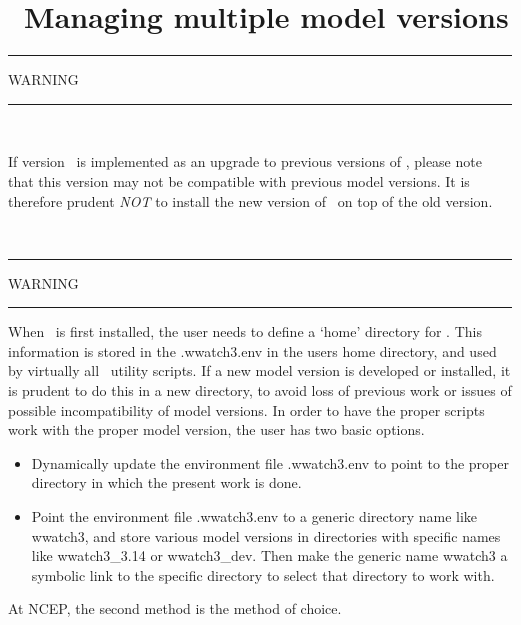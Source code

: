 \pagestyle{myheadings} \setcounter{page}{1} \setcounter{footnote}{0}

\section{~Managing multiple model versions} \label{app:more}
\newcounters 
\vssub

\begin{center}
\rule[1mm]{55mm}{1.0mm} WARNING \rule[1mm]{55mm}{1.0mm} \\ \vspace{\baselineskip}
\parbox{120mm}{If version \WWver\ is implemented as an upgrade to previous
versions of \ws, please note that this version may not be compatible with
previous model versions. It is therefore prudent {\it NOT} to install the new
version of \ws\ on top of the old version.} \\
\vspace{\baselineskip} \rule[1mm]{55mm}{1.0mm} WARNING
\rule[1mm]{55mm}{1.0mm}
\end{center}

\noindent
When \ws\ is first installed, the user needs to define a `home' directory for
\ws. This information is stored in the {\file .wwatch3.env} in the users home
directory, and used by virtually all \ws\ utility scripts. If a new model
version is developed or installed, it is prudent to do this in a new
directory, to avoid loss of previous work or issues of possible
incompatibility of model versions. In order to have the proper scripts work
with the proper model version, the user has two basic options.

\begin{itemize}

\item Dynamically update the environment file {\file .wwatch3.env} to point to
      the proper directory in which the present work is done.

\item Point the environment file {\file .wwatch3.env} to a generic directory
      name like {\file wwatch3}, and store various model versions in
      directories with specific names like {\file wwatch3\_3.14} or {\file
      wwatch3\_dev}. Then make the generic name {\file wwatch3} a symbolic
      link to the specific directory to select that directory to work with.

\end{itemize}

\noindent
At NCEP, the second method is the method of choice.




\bpage \pagestyle{empty}
